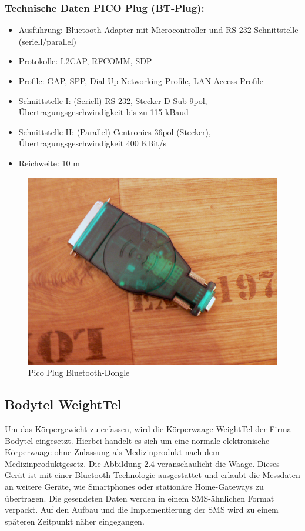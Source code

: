 \subsubsection*{Technische Daten PICO Plug (BT-Plug)\cite{PicoPlug}:}
\begin{itemize}

  \item Ausf\"uhrung: Bluetooth-Adapter mit Microcontroller und RS-232-Schnittstelle (seriell/parallel)
  \item Protokolle: L2CAP, RFCOMM, SDP
  \item Profile: GAP, SPP, Dial-Up-Networking Profile, LAN Access Profile  
  \item Schnittstelle I: (Seriell) RS-232, Stecker D-Sub 9pol, Übertragungsgeschwindigkeit bis zu 115 kBaud
  \item Schnittstelle II: (Parallel) Centronics 36pol (Stecker), Übertragungsgeschwindigkeit 400 KBit/s
  \item Reichweite: 10 m
    
\end{itemize}
 
\begin{figure}[h]
  \centering
  \includegraphics[scale=0.3]{fotos/devices/PicoPlug_bt_dongle.png}
  \caption{Pico Plug Bluetooth-Dongle}
 
\end{figure}

\subsection{Bodytel WeightTel}
Um das K\"orpergewicht zu erfassen, wird die K\"orperwaage WeightTel \cite{WeightTel} der Firma Bodytel eingesetzt.
Hierbei handelt es sich um eine normale elektronische K\"orperwaage ohne Zulassung als Medizinprodukt nach dem Medizinproduktgesetz.
Die Abbildung 2.4 veranschaulicht die Waage.
Dieses Ger\"at ist mit einer Bluetooth-Technologie ausgestattet und erlaubt die Messdaten an weitere Ger\"ate, wie Smartphones oder
station\"are Home-Gateways zu \"ubertragen.
Die gesendeten Daten werden in einem SMS-\"ahnlichen Format verpackt.
Auf den Aufbau und die Implementierung der SMS wird zu einem sp\"ateren Zeitpunkt n\"aher eingegangen.\\

